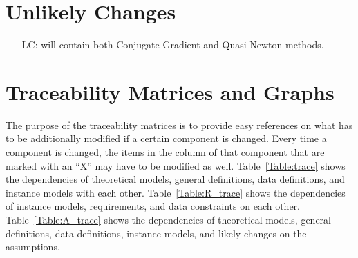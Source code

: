 \documentclass[12pt]{article}
\newcounter{lcnum} %
\begin{document}
\section{Unlikely Changes}    

\noindent \begin{itemize}

\item[LC\refstepcounter{lcnum}\thelcnum\label{LC_unlikely1}:] will contain both Conjugate-Gradient and Quasi-Newton methods.

\end{itemize}

\section{Traceability Matrices and Graphs}

The purpose of the traceability matrices is to provide easy references on what
has to be additionally modified if a certain component is changed.  Every time a
component is changed, the items in the column of that component that are marked
with an ``X'' may have to be modified as well.  Table~\ref{Table:trace} shows the
dependencies of theoretical models, general definitions, data definitions, and
instance models with each other. Table~\ref{Table:R_trace} shows the
dependencies of instance models, requirements, and data constraints on each
other. Table~\ref{Table:A_trace} shows the dependencies of theoretical models,
general definitions, data definitions, instance models, and likely changes on
the assumptions.



\end{document}
